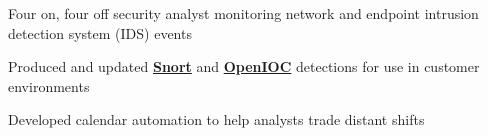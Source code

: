 \documentclass[letterpaper]{deedy-resume} %
\begin{document}
\begin{minipage}[t]{0.66\textwidth}
\sectionspace %



\begin{tightitemize}
\item Four on, four off security analyst monitoring network and endpoint intrusion detection system (IDS) events
\item Produced and updated \textbf{\href{https://www.snort.org/}{Snort}} and \textbf{\href{https://github.com/fireeye/OpenIOC_1.1}{OpenIOC}} detections for use in customer environments
\item Developed calendar automation to help analysts trade distant shifts
\end{tightitemize}

\sectionspace %




\end{minipage} %








\end{document}
